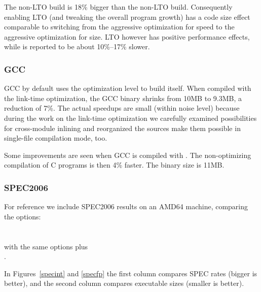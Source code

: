 \documentclass[final]{ols}
\begin{document}
The non-LTO  build is 18\% bigger than the non-LTO  build.
Consequently enabling LTO (and tweaking the overall program growth) has a code
size effect comparable to switching from the aggressive optimization for speed
to the aggressive optimization for size.  LTO however has positive performance
effects, while  is reported to be about 10\%--17\% slower.

\subsubsection{GCC}

GCC by default uses the  optimization level to build itself.  When
compiled with the link-time optimization, the GCC binary shrinks from
10MB to 9.3MB, a reduction of 7\%.  The actual speedups are
small (within noise level) because during the work on the link-time optimization we
carefully examined possibilities for cross-module inlining and reorganized
the sources make them possible in single-file compilation mode, too.

Some improvements are seen when GCC is compiled with . The non-optimizing
compilation of C programs is then 4\% faster.  The binary size is 11MB.

\subsubsection{SPEC2006}

For reference we include SPEC2006 results on an AMD64 machine, comparing
the options:\\
 \\
\\ with the same options plus\\
.

In Figures~\ref{specint} and \ref{specfp} the first column compares SPEC rates
(bigger is better), and the second column compares executable sizes (smaller is
better).
\end{document}
